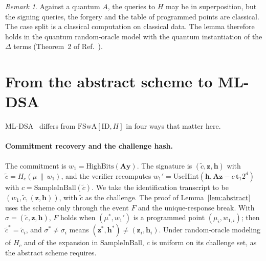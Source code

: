 \documentclass[aps,prx,reprint,superscriptaddress,nofootinbib,floatfix]{revtex4-2}
\theoremstyle{remark}
\newtheorem*{remark}{Remark}
\newcommand{\Hc}{H_{c}}
\begin{document}
\begin{remark}
Against a quantum $A$, the queries to $H$ may be in superposition, but the signing queries, the forgery and the table of programmed points are classical. The case split is a classical computation on classical data. The lemma therefore holds in the quantum random-oracle model with the quantum instantiation of the $\Delta$ terms (Theorem~2 of Ref.~\cite{fsa-fix}).
\end{remark}

\section{From the abstract scheme to ML-DSA}

ML-DSA~\cite{fips204} differs from $\mathrm{FSwA}[\mathrm{ID},H]$ in four ways that matter here.

\paragraph*{Commitment recovery and the challenge hash.} The commitment is $w_1=\mathrm{HighBits}(\mathbf A\mathbf y)$. The signature is $(\tilde c,\mathbf z,\mathbf h)$ with $\tilde c=\Hc(\mu\,\|\,w_1)$, and the verifier recomputes $w_1'=\mathrm{UseHint}(\mathbf h,\mathbf A\mathbf z-c\,\mathbf t_1 2^d)$ with $c=\mathrm{SampleInBall}(\tilde c)$. We take the identification transcript to be $(w_1,\tilde c,(\mathbf z,\mathbf h))$, with $\tilde c$ as the challenge. The proof of Lemma~\ref{lem:abstract} uses the scheme only through the event $F$ and the unique-response break. With $\sigma=(\tilde c,\mathbf z,\mathbf h)$, $F$ holds when $(\mu^\ast,w_1')$ is a programmed point $(\mu_i,w_{1,i})$; then $\tilde c^\ast=\tilde c_i$, and $\sigma^\ast\neq\sigma_i$ means $(\mathbf z^\ast,\mathbf h^\ast)\neq(\mathbf z_i,\mathbf h_i)$. Under random-oracle modeling of $\Hc$ and of the expansion in SampleInBall, $c$ is uniform on its challenge set, as the abstract scheme requires.
\end{document}
